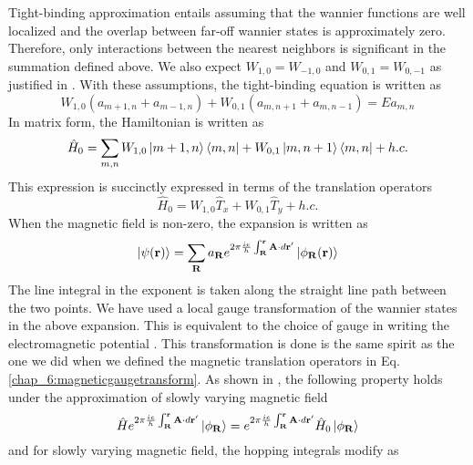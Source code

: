 Tight-binding approximation entails assuming that the wannier functions are well localized and the overlap between far-off wannier states is approximately zero. Therefore, 
only interactions between the nearest neighbors is significant in the summation defined above. We also expect $W_{1, 0} = W_{-1, 0}$ and $W_{0, 1} = W_{0, -1}$ as justified in \parencite{stockmann2006quantum}.
With these assumptions, the tight-binding equation is written as
\begin{equation}
 W_{1,0}(a_{m+1, n} + a_{m-1, n}) + W_{0, 1}(a_{m, n+1} + a_{m, n-1}) = Ea_{m, n}
\end{equation} In matrix form, the Hamiltonian is written as
\begin{equation}
\hat{H}_{0} = \sum_{m,n} W_{1,0}\ket{m+1, n}\bra{m, n} + W_{0,1}\ket{m, n+1}\bra{m, n} + h.c.
\end{equation}
This expression is succinctly expressed in terms of the translation operators
\begin{equation}
  \hat{H}_{0} = W_{1,0}\hat{T}_{x} + W_{0,1}\hat{T}_{y} + h.c.
\end{equation}
When the magnetic field is non-zero, the expansion is written as \cite{luttinger1951effect, wannier1962dynamics, stockmann2006quantum,bernevig2013topological}
\begin{align}
  \ket{\psi(\mathbf{r})} = \sum_{\mathbf{R}}{a_{\mathbf{R}} e^{2\pi \frac{ie}{h}\int_{\mathbf{R}}^{\mathbf{r}}{\mathbf{A}\cdot d\mathbf{r}'}}\ket{\phi_{\mathbf{R}}(\mathbf{r})}}
\end{align}
The line integral in the exponent is taken along the straight line path between the two points. We have used a local gauge transformation of the wannier states in the above expansion.
This is equivalent to the choice of gauge in writing the electromagnetic potential \cite{sakurai2011modern,kitel1971introduction,moriyasu1983elementary}. This transformation is done is the same
spirit as the one we did when we defined the magnetic translation operators in Eq. \eqref{chap_6:magneticgaugetransform}. As shown in \parencite{luttinger1951effect},
the following property holds under the approximation of slowly varying magnetic field
\begin{equation}
 \hat{H}e^{2\pi \frac{ie}{h}\int_{\mathbf{R}}^{\mathbf{r}}{\mathbf{A}\cdot d\mathbf{r}'}}\ket{\phi_{\mathbf{R}}} = e^{2\pi \frac{ie}{h}\int_{\mathbf{R}}^{\mathbf{r}}{\mathbf{A}\cdot d\mathbf{r}'}}\hat{H}_{0}\ket{\phi_{\mathbf{R}}}
\end{equation} and for slowly varying magnetic field, the hopping integrals modify as

